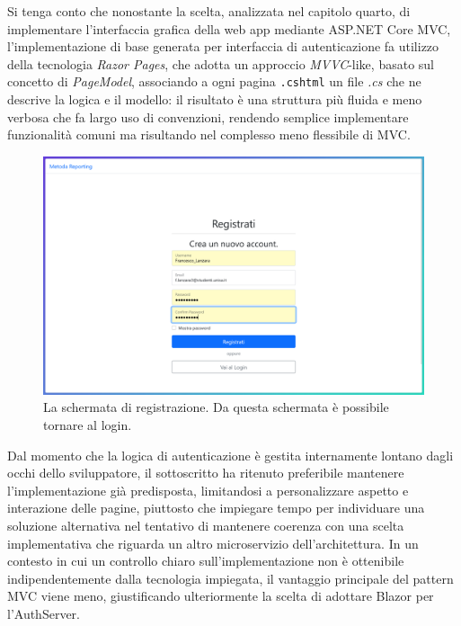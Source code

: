 Si tenga conto che nonostante la scelta, analizzata nel capitolo quarto, di implementare l'interfaccia grafica della web app mediante ASP.NET Core MVC, l'implementazione di base generata per interfaccia di autenticazione fa utilizzo della tecnologia \emph{Razor Pages}, che adotta un approccio \emph{MVVC}-like, basato sul concetto di \emph{PageModel}, associando a ogni pagina \texttt{.cshtml} un file \emph{.cs} che ne descrive la logica e il modello: il risultato è una struttura più fluida e meno verbosa che fa largo uso di convenzioni, rendendo semplice implementare funzionalità comuni ma risultando nel complesso meno flessibile di MVC.
\begin{figure}[H]
        \centering
        \includegraphics[width=15.5cm]{fig/screen_register.png}
        \caption[Schermata registrazione]{La schermata di registrazione. Da questa schermata è possibile tornare al login.}
\end{figure}
Dal momento che la logica di autenticazione è gestita internamente lontano dagli occhi dello sviluppatore, il sottoscritto ha ritenuto preferibile mantenere l'implementazione già predisposta, limitandosi a personalizzare aspetto e interazione delle pagine, piuttosto che impiegare tempo per individuare una soluzione alternativa nel tentativo di mantenere coerenza con una scelta implementativa che riguarda un altro microservizio dell'architettura. In un contesto in cui un controllo chiaro sull'implementazione non è ottenibile indipendentemente dalla tecnologia impiegata, il vantaggio principale del pattern MVC viene meno, giustificando ulteriormente la scelta di adottare Blazor per l'AuthServer.

